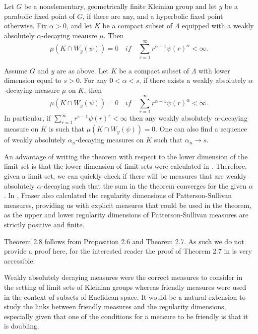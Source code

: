 \begin{thm}
	Let $G$ be a nonelementary, geometrically finite Kleinian group and let $y$ be a parabolic fixed point of $G$, if there are any, and a hyperbolic fixed point otherwise. Fix $\alpha > 0$, and let $K$ be a compact subset of $\Lambda$ equipped with a weakly absolutely $\alpha$-decaying meausre $\mu$. Then
	\[
	\mu(K\cap W_y(\psi)) = 0 \quad if \quad \sum_{r=1}^\infty r^{\alpha-1} \psi(r)^{\alpha} < \infty.
	\]
\end{thm}

\begin{thm}
	Assume $G$ and $y$ are as above. Let $K$ be a compact subset of $\Lambda$ with lower dimension equal to $s > 0$. For any $0 < \alpha < s$, if there exists a weakly absolutely $\alpha$-decaying measure $\mu$ on $K$, then
	\[
	\mu(K\cap W_y(\psi)) = 0 \quad if \quad \sum_{r=1}^\infty r^{\alpha-1} \psi(r)^{\alpha} < \infty.
	\]
	In particular, if  $\sum_{r=1}^\infty r^{s-1} \psi(r)^{s} < \infty$ then any weakly absolutely $\alpha$-decaying measure on $K$ is such that $\mu(K\cap W_y(\psi)) = 0$. One can also find a sequence of weakly absolutely $\alpha_n$-decaying measures on $K$ such that $\alpha_n \rightarrow s$. 
\end{thm}

An advantage of writing the theorem with respect to the lower dimension of the limit set is that the lower dimension of limit sets were calculated in \cite{fraser2}. Therefore, given a limit set, we can quickly check if there will be measures that are weakly absolutely $\alpha$-decaying such that the sum in the theorem converges for the given $\alpha$. In \cite{fraser2}, Fraser also calculated the regularity dimensions of Patterson-Sullivan measures, providing us with explicit measures that could be used in the theorem, as the upper and lower regularity dimensions of Patterson-Sullivan measures are strictly positive and finite. 

Theorem 2.8 follows from Proposition 2.6 and Theorem 2.7. As such we do not provide a proof here, for the interested reader the proof of Theorem 2.7 in \cite{beres-sanju-al} is very accessible.

Weakly absolutely decaying measures were the correct measures to consider in the setting of limit sets of Kleinian groups whereas friendly measures were used in the context of subsets of Euclidean space. It would be a natural extension to study the links between friendly measures and the regularity dimensions, especially given that one of the conditions for a measure to be friendly is that it is doubling.  



